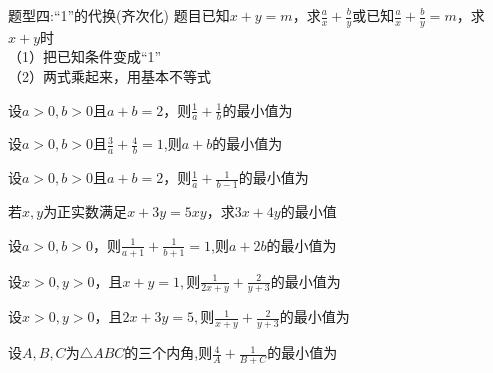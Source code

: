 \documentclass[11pt,a4paper]{ctexbook}
\begin{document}
\begin{tcolorbox} 
    \centering
    题型四:“1”的代换(齐次化)
    \tcblower %
    题目已知$x+y=m$，求$\displaystyle \frac{a}{x}+\frac{b}{y}$\quad 或\quad 已知$\displaystyle \frac{a}{x}+\frac{b}{y}=m$，求$x+y$时\\
    （1）把已知条件变成“1” \\
    （2）两式乘起来，用基本不等式
\end{tcolorbox}

\par
\begin{problem}
    设$a>0,b>0$且$a+b=2$，则$\displaystyle \frac{1}{a}+\frac{1}{b}$的最小值为
\end{problem}

\par
\begin{problem}
    设$a>0,b>0$且$\displaystyle \frac{3}{a}+\frac{4}{b}=1$,则$a+b$的最小值为
\end{problem}

\par
\begin{problem}
    设$a>0,b>0$且$a+b=2$，则$\displaystyle \frac{1}{a}+\frac{1}{b-1}$的最小值为
\end{problem}

\par
\begin{problem}
    若$x,y$为正实数满足$x+3y=5xy$，求$3x+4y$的最小值
\end{problem}

\par
\begin{problem}
    设$a>0,b>0$，则$\displaystyle \frac{1}{a+1}+\frac{1}{b+1}=1$,则$a+2b$的最小值为
\end{problem}

\par
\begin{problem}
    设$x>0,y>0$，且$x+y=1,$则$\displaystyle \frac{1}{2x+y}+\frac{2}{y+3}$的最小值为
\end{problem}

\par
\begin{problem}
    设$x>0,y>0$，且$2x+3y=5,$则$\displaystyle \frac{1}{x+y}+\frac{2}{y+3}$的最小值为
\end{problem}

\par
\begin{problem}
    设$A,B,C$为$\bigtriangleup ABC$的三个内角,则$\displaystyle \frac{4}{A}+\frac{1}{B+C}$的最小值为
\end{problem}
\end{document}
